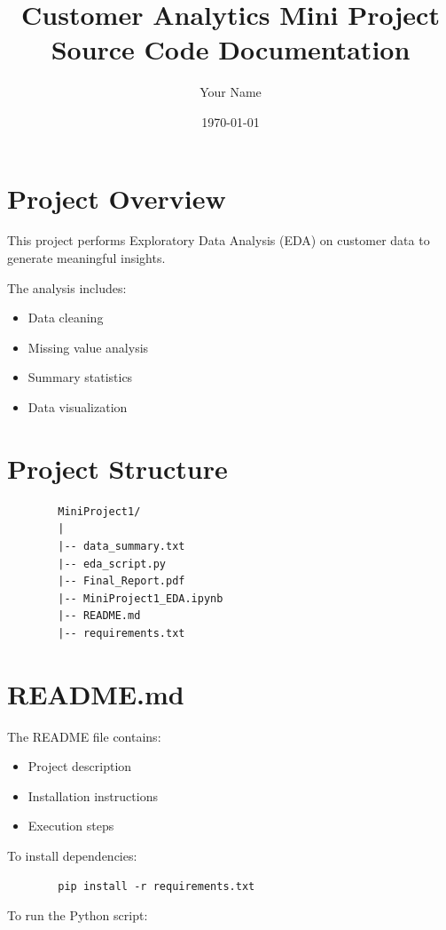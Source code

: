 \documentclass[12pt]{article}
\title{\textbf{Customer Analytics Mini Project}\\
	Source Code Documentation}
\author{Your Name}
\date{\today}
\begin{document}
	
	\maketitle
	\tableofcontents
	\newpage
	
	\section{Project Overview}
	
	This project performs Exploratory Data Analysis (EDA) 
	on customer data to generate meaningful insights. 
	
	The analysis includes:
	\begin{itemize}
		\item Data cleaning
		\item Missing value analysis
		\item Summary statistics
		\item Data visualization
	\end{itemize}
	
	\section{Project Structure}
	
	\begin{verbatim}
		MiniProject1/
		|
		|-- data_summary.txt
		|-- eda_script.py
		|-- Final_Report.pdf
		|-- MiniProject1_EDA.ipynb
		|-- README.md
		|-- requirements.txt
	\end{verbatim}
	
	\section{README.md}
	
	The README file contains:
	\begin{itemize}
		\item Project description
		\item Installation instructions
		\item Execution steps
	\end{itemize}
	
	To install dependencies:
	
	\begin{verbatim}
		pip install -r requirements.txt
	\end{verbatim}
	
	To run the Python script:
	
\end{document}
